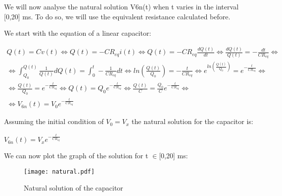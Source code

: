 We will now analyse the natural solution V6n(t) when t varies in the interval [0,20] ms. To do so, we will use the equivalent resistance calculated before.

We start with the equation of a linear capacitor:

\begin{gather}
	Q(t)=Cv(t) \iff Q(t)=-CR_{eq}i(t) \iff Q(t)=-CR_{eq}\frac{dQ(t)}{dt} \iff \frac{dQ(t)}{Q(t)}=-\frac{dt}{CR_{eq}} \iff \nonumber \\ \iff \int_{Q_0}^{Q(t)}\frac{1}{Q(t)}dQ(t)=\int_{0}^{t}-\frac{1}{CR_{eq}}dt \iff ln(\frac{Q(t)}{Q_0})=-\frac{t}{CR_{eq}} \iff e^{ln(\frac{Q(t)}{Q_0})}=e^{-\frac{t}{CR_{eq}}} \iff \nonumber \\ \iff \frac{Q(t)}{Q_0}=e^{-\frac{t}{CR_{eq}}} \iff Q(t)=Q_0e^{-\frac{t}{CR_{eq}}} \iff \frac{Q(t)}{C}=\frac{Q_0}{C}e^{-\frac{t}{CR_{eq}}} \iff \nonumber \\ \iff V_{6n}(t)=V_0e^{-\frac{t}{CR_{eq}}}
\end{gather}

Assuming the initial condition of $V_0=V_x$ the natural solution for the capacitor is:

\vspace{10pt}

$V_{6n}(t)=V_xe^{-\frac{t}{CR_{eq}}}$

\vspace{10pt}

We can now plot the graph of the solution for t $\in$[0,20] ms:

\begin{figure}[h]
	\centering
	\texttt{[image: natural.pdf]}
	\caption{Natural solution of the capacitor}
	\label{fig:natural}
\end{figure}

\newpage

